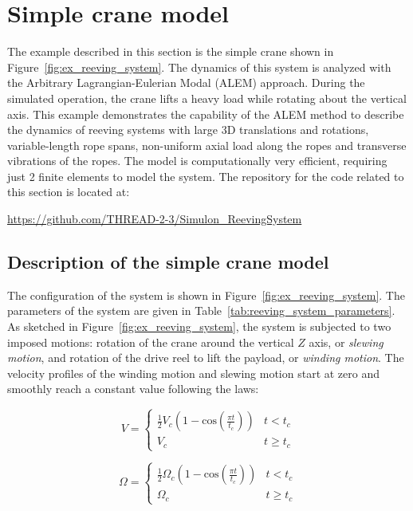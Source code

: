 \section{Simple crane model}\label{sec:craneSimulon}
The example described in this section is the simple crane shown in Figure~\ref{fig:ex_reeving_system}. The dynamics of this system is analyzed with the Arbitrary Lagrangian-Eulerian Modal (ALEM) approach. During the simulated operation, the crane lifts a heavy load while rotating about the vertical axis. This example demonstrates the capability of the ALEM method to describe the dynamics of reeving systems with large 3D translations and rotations, variable-length rope spans, non-uniform axial load along the ropes and transverse vibrations of the ropes. The model is computationally very efficient, requiring just 2 finite elements to model the system. The repository for the code related to this section is located at:
\bi
  \item[] \url{https://github.com/THREAD-2-3/Simulon_ReevingSystem}
\ei

\subsection{Description of the simple crane model}
The configuration of the system is shown in Figure~\ref{fig:ex_reeving_system}. The parameters of the system are given in Table~\ref{tab:reeving_system_parameters}. As sketched in Figure~\ref{fig:ex_reeving_system}, the system is subjected to two imposed motions: rotation of the crane around the vertical $Z$ axis, or \textit{slewing motion}, and rotation of the drive reel to lift the payload, or \textit{winding motion}. The velocity profiles of the winding motion and slewing motion start at zero and smoothly reach a constant value following the laws: 

\begin{equation}
V = \left\{ {\begin{array}{*{20}{c}}
\frac{1}{2}V_c(1-\text{cos}(\frac{\pi t}{t_c}))&t < t_c\\
V_c&t \ge t_c
\end{array}} \right.
 \label{eq:rotation_angle}
\end{equation}


\begin{equation}
\Omega = \left\{ {\begin{array}{*{20}{c}}
\frac{1}{2}\Omega_c(1-\text{cos}(\frac{\pi t}{t_c}))&t < t_c\\
\Omega_c&t \ge t_c
\end{array}} \right.
 \label{eq:rotation_angleB}
\end{equation}

